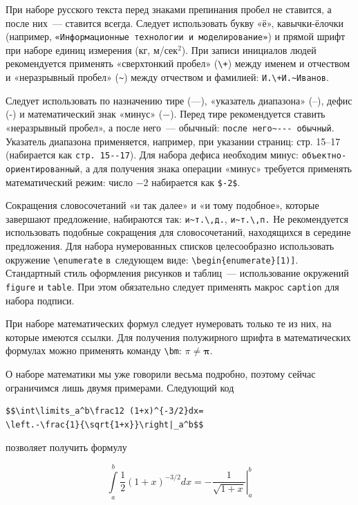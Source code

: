 При наборе русского текста перед знаками препинания пробел не ставится, 
а после них~--- ставится всегда. Следует использовать букву «ё», 
кавычки-ёлочки 
(например, \verb|«Информационные технологии и моделирование»|) и
прямой шрифт при наборе единиц измерения (кг, м/сек${}^2$).
При записи инициалов людей рекомендуется применять «сверхтонкий пробел» 
(\verb|\+|) между именем и отчеством и «неразрывный пробел» (\verb|~|) между
отчеством и фамилией: \verb|И.\+И.~Иванов|. 

Следует использовать по назначению тире
(---), «указатель диапазона» (--), дефис (-) и математический знак «минус»
($-$). Перед тире рекомендуется ставить «неразрывный
пробел», а после него~--- обычный: \verb|после него~--- обычный|. Указатель
диапазона применяется, например, при указании страниц: стр. 15--17
(набирается как \verb|стр. 15--17|). Для набора дефиса необходим минус: 
\verb|объектно-ориентированный|, а для получения знака операции  «минус»
требуется применять математический режим: число $-2$ набирается как
\verb|$-2$|. 

Сокращения словосочетаний «и так далее» и «и тому подобное», которые
завершают предложение, набираются так: \verb|и~т.\,д.|, \verb|и~т.\,п.|
Не рекомендуется использовать подобные сокращения для словосочетаний,
находящихся в середине предложения. Для набора нумерованных списков 
целесообразно использовать окружение \verb|\enumerate| в~следующем виде:
\verb|\begin{enumerate}[1)]|.
Стандартный стиль оформления рисунков и таблиц~--- использование окружений
\verb|figure| и \verb|table|. При этом обязательно следует применять макрос
\verb|caption| для набора подписи. 

При наборе математических формул следует нумеровать только те из них, на
которые имеются ссылки. Для получения полужирного шрифта в математических
формулах можно применять команду \verb|\bm|: $\pi \ne \bm\pi$.

О наборе математики мы уже говорили весьма подробно, поэтому сейчас 
ограничимся лишь двумя примерами. Следующий код
\begin{small}
\begin{verbatim}
$$\int\limits_a^b\frac12 (1+x)^{-3/2}dx=
\left.-\frac{1}{\sqrt{1+x}}\right|_a^b$$
\end{verbatim}
\end{small}
\noindent позволяет получить формулу

$$\int\limits_a^b\frac12 (1+x)^{-3/2}dx=
\left.-\frac{1}{\sqrt{1+x}}\right|_a^b$$

